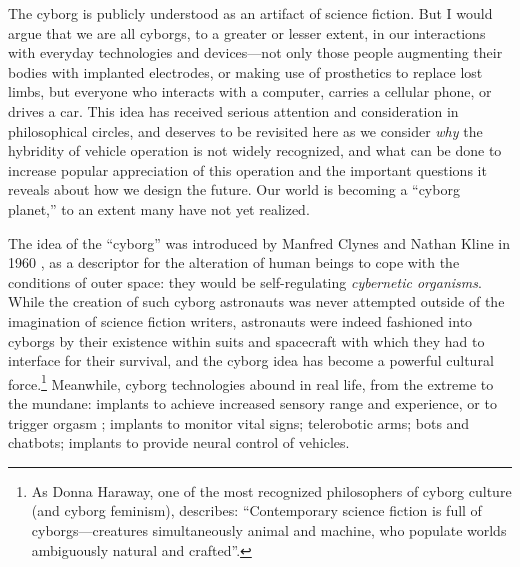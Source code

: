 
The cyborg is publicly understood as an artifact of science
fiction. But I would argue that we are
all cyborgs, to a greater or lesser extent, in our interactions with
everyday technologies and devices---not only those people augmenting
their bodies with implanted electrodes, or making use of prosthetics
to replace lost limbs, but everyone who interacts with a computer,
carries a cellular phone, or drives a car. This idea has received
serious attention and consideration in philosophical circles, and
deserves to be revisited here as we consider \emph{why} the hybridity
of vehicle operation is not widely recognized, and what can be done to
increase popular appreciation of this operation and the important
questions it reveals about how we design the future. Our world is
becoming a ``cyborg planet,'' to an extent many have not yet
realized\cite[p. 64]{ekbia}.

The idea of the ``cyborg'' was introduced by Manfred Clynes and Nathan
Kline in 1960 \cite{???-clyneskline-intoread}, as a descriptor for the alteration of human beings to
cope with the conditions of outer space: they would be self-regulating
\emph{cybernetic organisms}\cite[p. 66]{ekbia}. While the creation of
such cyborg astronauts was never attempted outside of the imagination
of science fiction writers, astronauts were indeed fashioned into
cyborgs by their existence within suits and spacecraft with which they
had to interface for their survival, and the cyborg idea has become a
powerful cultural force.\footnote{As Donna Haraway, one of the most recognized
philosophers of cyborg culture (and cyborg feminism), describes:
``Contemporary science 
fiction is full of cyborgs---creatures simultaneously
animal and machine, who populate worlds ambiguously natural and
crafted''\cite[p. 117]{???-haraway}.} Meanwhile, cyborg technologies
abound in real life, from the extreme to the mundane: implants to
achieve increased sensory range and experience, or to trigger orgasm
\cite[p. 64]{ekbia}; implants to monitor vital signs; telerobotic
arms; bots and chatbots; implants to provide neural control of
vehicles\cite[p. 65]{ekbia}. 


